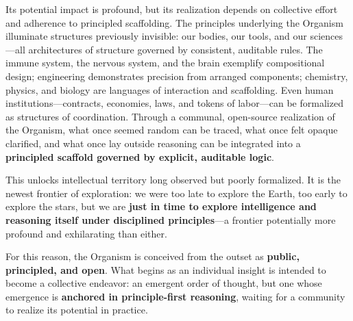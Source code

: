 \documentclass[12pt]{article}
\begin{document}
Its potential impact is profound, but its realization depends on collective effort and adherence to principled scaffolding. The principles underlying the Organism illuminate structures previously invisible: our bodies, our tools, and our sciences—all architectures of structure governed by consistent, auditable rules. The immune system, the nervous system, and the brain exemplify compositional design; engineering demonstrates precision from arranged components; chemistry, physics, and biology are languages of interaction and scaffolding. Even human institutions—contracts, economies, laws, and tokens of labor—can be formalized as structures of coordination. Through a communal, open-source realization of the Organism, what once seemed random can be traced, what once felt opaque clarified, and what once lay outside reasoning can be integrated into a \textbf{principled scaffold governed by explicit, auditable logic}.  

This unlocks intellectual territory long observed but poorly formalized. It is the newest frontier of exploration: we were too late to explore the Earth, too early to explore the stars, but we are \textbf{just in time to explore intelligence and reasoning itself under disciplined principles}—a frontier potentially more profound and exhilarating than either.  

For this reason, the Organism is conceived from the outset as \textbf{public, principled, and open}. What begins as an individual insight is intended to become a collective endeavor: an emergent order of thought, but one whose emergence is \textbf{anchored in principle-first reasoning}, waiting for a community to realize its potential in practice.
\end{document}
